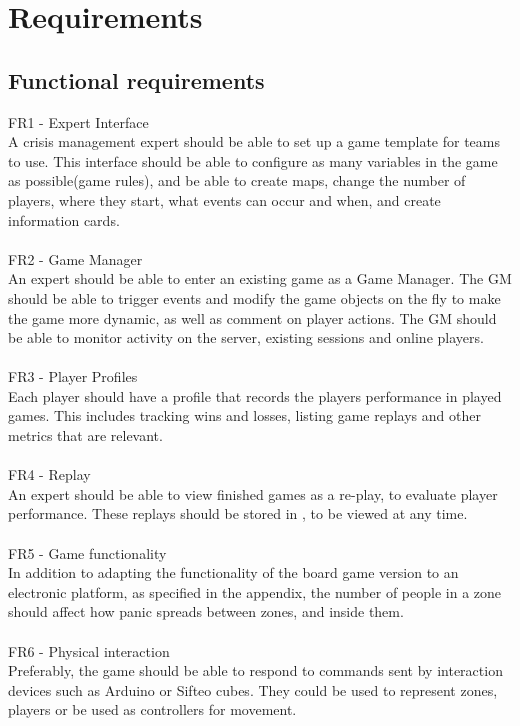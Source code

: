 \chapter{Requirements}
\section{Functional requirements}


FR1 - Expert Interface\\
A crisis management expert should be able to set up a game template for teams to use. This interface should be able to configure as many variables in the game as possible(game rules), and be able to create maps, change the number of players, where they start, what events can occur and when, and create information cards.\\
\\
FR2 - Game Manager\\
An expert should be able to enter an existing game as a Game Manager. The GM should be able to trigger events and modify the game objects on the fly to make the game more dynamic, as well as comment on player actions. The GM should be able to monitor activity on the server, existing sessions and online players.\\
\\
FR3 - Player Profiles\\
Each player should have a profile that records the players performance in played games. This includes tracking wins and losses, listing game replays and other metrics that are relevant.\\
\\
FR4 - Replay\\
An expert should be able to view finished games as a re-play, to evaluate player performance. These replays should be stored in , to be viewed at any time.\\
\\
FR5 - Game functionality\\
In addition to adapting the functionality of the board game version to an electronic platform, as specified in the appendix, the number of people in a zone should affect how panic spreads between zones, and inside them. \\
\\
FR6 - Physical interaction\\
Preferably, the game should be able to respond to commands sent by interaction devices such as Arduino or Sifteo cubes. They could be used to represent zones, players or be used as controllers for movement.\\
\\


